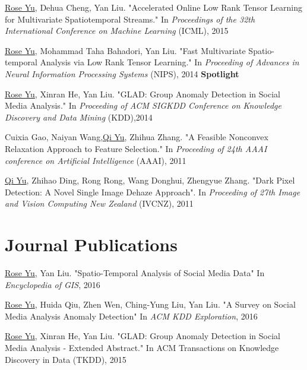 \documentclass[margin,line]{res}
\begin{document}
\begin{resume}
\begin{enumerate}[label={[C\arabic*]}]
\item \underline{Rose Yu}, Dehua Cheng, Yan Liu. "Accelerated Online Low Rank Tensor Learning for Multivariate Spatiotemporal Streams." In \textit{Proceedings  of the 32th International Conference on Machine Learning} (ICML), 2015

\item \underline{Rose Yu}, Mohammad Taha Bahadori, Yan Liu. "Fast Multivariate Spatio-temporal Analysis via Low Rank Tensor Learning." In \textit{Proceeding of Advances in Neural Information Processing Systems} (NIPS), 2014 \textbf{Spotlight}

\item \underline{Rose Yu}, Xinran He, Yan Liu. "GLAD: Group Anomaly Detection in Social Media Analysis." In \textit{Proceeding of ACM SIGKDD Conference on Knowledge Discovery and Data Mining} (KDD),2014

\item Cuixia Gao, Naiyan Wang,\underline{Qi Yu}, Zhihua Zhang. "A Feasible Nonconvex Relaxation Approach to Feature Selection." In \textit{Proceeding of 24th AAAI conference on Artificial Intelligence} (AAAI), 2011 

\item  \underline{Qi Yu}, Zhihao Ding, Rong Rong, Wang Donghui, Zhengyue Zhang. "Dark Pixel Detection: A Novel Single Image Dehaze Approach". In \textit{Proceeding of 27th Image and Vision Computing New Zealand }(IVCNZ), 2011  
\end{enumerate}

 
\section{\sc Journal Publications}
\begin{enumerate}[label={[J\arabic*]}]
\item \underline{Rose Yu},  Yan Liu.  "Spatio-Temporal Analysis of Social Media Data"  In \textit{Encyclopedia of GIS}, 2016

\item \underline{Rose Yu}, Huida Qiu, Zhen Wen, Ching-Yung Liu,  Yan Liu. "A Survey on Social Media Analysis  Anomaly Detection" In \textit{ACM KDD Exploration},  2016

\item \underline{Rose Yu}, Xinran He, Yan Liu. "GLAD: Group Anomaly Detection in Social Media Analysis - Extended Abstract." In \textit{}ACM Transactions on Knowledge Discovery in Data  (TKDD), 2015
\end{enumerate}


\end{resume}
\end{document}
